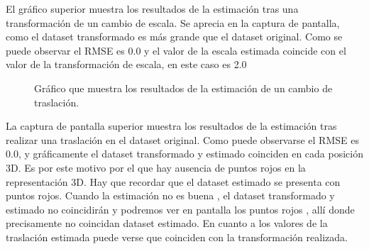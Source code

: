 El gráfico superior muestra los resultados de la estimación tras una transformación de un cambio de escala. Se aprecia en la captura de pantalla, como el dataset transformado es más grande que el dataset original. Como se puede observar el RMSE es 0.0 y el valor de la escala estimada coincide con el valor de la transformación de escala, en este caso es 2.0

\begin{figure}
\begin{center}
\hspace{0.5cm}

\end{center}

\caption{Gráfico que muestra los resultados de la estimación de un cambio de traslación.}
\end{figure}

La captura de pantalla superior muestra los resultados de la estimación tras realizar una traslación en el dataset original. Como puede observarse el RMSE es 0.0, y gráficamente el dataset transformado y estimado coinciden en cada posición 3D.  Es por este motivo por el que hay ausencia de puntos rojos en la representación 3D. Hay que recordar que el dataset estimado se presenta con puntos rojos. Cuando la estimación no es buena , el dataset transformado y estimado no coincidirán y podremos ver en pantalla los puntos rojos , allí donde precisamente no coincidan dataset estimado. En cuanto a los valores de la traslación estimada puede verse que coinciden con la transformación realizada.

